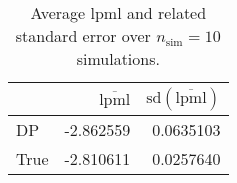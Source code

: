 \begin{table}[H]

\caption{Average lpml and related standard error over $n_{\text{sim}} = 10$ simulations.}
\centering
\begin{tabular}[t]{lrr}
\toprule
  & $\overbar{\text{lpml}}$ & $\text{sd}(\overbar{\text{lpml}})$\\
\midrule
DP & -2.862559 & 0.0635103\\
True & -2.810611 & 0.0257640\\
\bottomrule
\end{tabular}
\end{table}
